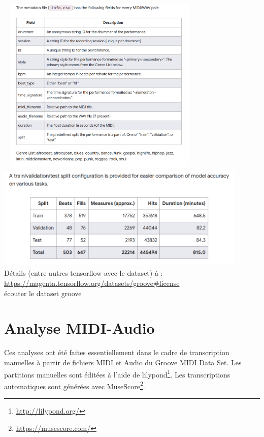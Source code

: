 \includegraphics[height=85mm, 
width=100mm]{z_images/3_groove/csv_metadata_struct.png}\\
\includegraphics[height=50mm, width=120mm]{z_images/3_groove/train_validation_test.png}\\
Détails (entre autres tensorflow avec le dataset) à :
\url{https://magenta.tensorflow.org/datasets/groove#license}\\
écouter le dataset groove
\section{Analyse MIDI-Audio}
\label{analyse_midi_audio}
Ces analyses ont été faites essentiellement dans le cadre de transcription manuelles à partir de fichiers MIDI et Audio du Groove MIDI Data Set. Les partitions manuelles sont éditées à l’aide de lilypond\footnote{\url{http://lilypond.org/}}. Les transcriptions automatiques sont générées avec MuseScore\footnote{\url{https://musescore.com/}}.
